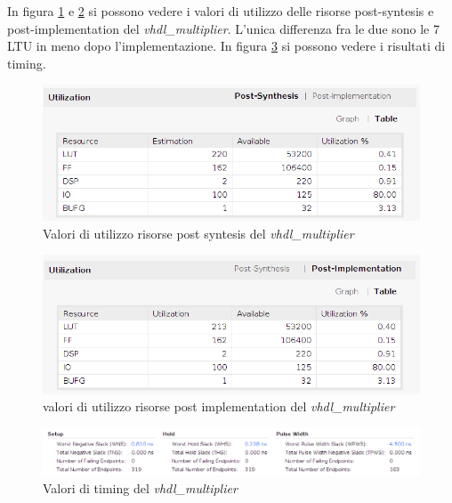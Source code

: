 \documentclass[]{IEEEtran}
\begin{document}
In figura \ref{fig:UTIL_SYNT_VHDL} e \ref{fig:UTIL_IMPL_VHDL} si possono vedere i valori di utilizzo delle risorse post-syntesis e post-implementation del \textit{vhdl\_multiplier}. L'unica differenza fra le due sono le 7 LTU in meno dopo l'implementazione. In figura \ref{fig:TIMING_VHDL} si possono vedere i risultati di timing.
\begin{figure}[!htb]
    \centering
    \includegraphics[width=0.9\linewidth]{figures/util_synt_vhdl}
    \caption{Valori di utilizzo risorse post syntesis del \textit{vhdl\_multiplier}}
    \label{fig:UTIL_SYNT_VHDL}
\end{figure}
\begin{figure}[!htb]
    \centering
    \includegraphics[width=0.9\linewidth]{figures/util_impl_vhdl}
    \caption{valori di utilizzo risorse post implementation del \textit{vhdl\_multiplier}}
    \label{fig:UTIL_IMPL_VHDL}
\end{figure}
\begin{figure}[!htb]
    \centering
    \includegraphics[width=0.9\linewidth]{figures/timing_vhdl}
    \caption{Valori di timing del \textit{vhdl\_multiplier}}
    \label{fig:TIMING_VHDL}
\end{figure}
\end{document}
